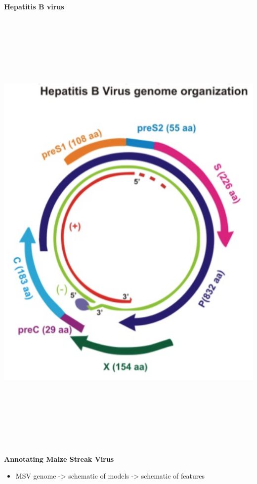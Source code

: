 \documentclass[landscape]{slides}
\begin{document}
\begin{slide}
\textbf{Hepatitis B virus}

\begin{center}
\includegraphics[height=9in]{figs/hbv-genome}
\end{center}
\vfill
\end{slide}
\begin{slide}
\begin{center}
\textbf{Annotating Maize Streak Virus} 

\begin{itemize}
\item MSV genome -> schematic of models -> schematic of features
\end{itemize}

\end{center}
\vfill
\end{slide}
\end{document}
